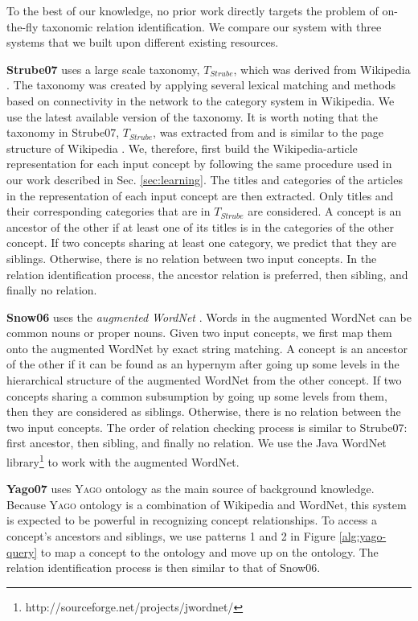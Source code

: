 To the best of our knowledge, no prior work directly targets the
problem of on-the-fly taxonomic relation identification. We compare
our system with three systems that we built upon different existing
resources.


{\bf Strube07} uses a large scale taxonomy, $T_{Strube}$, which was
derived from Wikipedia \cite{wikitaxo07}. The taxonomy was created by
applying several lexical matching and methods based on connectivity in
the network to the category system in Wikipedia. We use the latest
available version of the taxonomy. It is worth noting that the
taxonomy in Strube07, $T_{Strube}$, was extracted from and is similar to
the page structure of Wikipedia \cite{wikitaxo07}. We, therefore,
first build the Wikipedia-article representation for each input
concept by following the same procedure used in our work described in
Sec. \ref{sec:learning}. The titles and categories of the articles in
the representation of each input concept are then extracted. Only
titles and their corresponding categories that are in $T_{Strube}$ are
considered. A concept is an ancestor of the other if at least one of
its titles is in the categories of the other concept. If two concepts
sharing at least one category, we predict that they are
siblings. Otherwise, there is no relation between two input
concepts. In the relation identification process, the ancestor
relation is preferred, then sibling, and finally no relation.

{\bf Snow06} uses the {\em augmented WordNet} \cite{Snow2006}. Words
in the augmented WordNet can be common nouns or proper nouns. Given
two input concepts, we first map them onto the augmented WordNet
by exact string matching. A concept is an ancestor of the other if
it can be found as an hypernym after going up some levels in the
hierarchical structure of the augmented WordNet from the other
concept. If two concepts sharing a common subsumption by going up some
levels from them, then they are considered as siblings. Otherwise,
there is no relation between the two input concepts. The order of
relation checking process is similar to Strube07: first ancestor, then
sibling, and finally no relation. We use the Java WordNet
library\footnote{http://sourceforge.net/projects/jwordnet/} to work
with the augmented WordNet.

{\bf Yago07} uses \textsc{Yago} ontology \cite{suchanek2007WWW} as the
main source of background knowledge. Because \textsc{Yago} ontology is
a combination of Wikipedia and WordNet, this system is expected to be
powerful in recognizing concept relationships. To access a concept's
ancestors and siblings, we use patterns 1 and 2 in
Figure \ref{alg:yago-query} to map a concept to the ontology and move up
on the ontology. The relation identification process is then similar
to that of Snow06.

